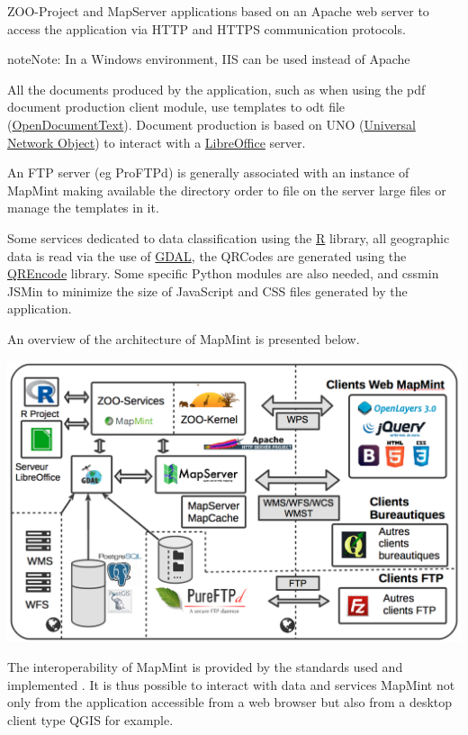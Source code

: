 \documentclass[letterpaper,10pt,english]{sphinxmanual}
\begin{document}
ZOO-Project and MapServer applications based on an Apache web server to access the application via HTTP and HTTPS communication protocols.

\begin{notice}{note}{Note:}
In a Windows environment, IIS can be used instead of Apache
\end{notice}

All the documents produced by the application, such as when using the pdf document production client module, use templates to odt file (\href{https://www.oasis-open.org/committees/tc\_home.php?wg\_abbrev=office}{OpenDocumentText}). Document production is based on UNO (\href{https://www.openoffice.org/udk/common/man/uno.html}{Universal Network Object}) to interact with a \href{http://www.libreoffice.org/}{LibreOffice} server.

An FTP server (eg ProFTPd) is generally associated with an instance of MapMint making available the directory  order to file on the server large files or manage the templates in it.

Some services dedicated to data classification using the \href{http://r-project.org}{R} library, all geographic data is read via the use of  \href{http://www.gdal.org}{GDAL}, the QRCodes are generated using the \href{https://fukuchi.org/works/qrencode/}{QREncode} library. Some specific Python modules are also needed, and cssmin JSMin to minimize the size of JavaScript and CSS files generated by the application.

An overview of the architecture of MapMint is presented below.

\includegraphics{mapmint-arch.png}

The interoperability of MapMint is provided by the standards used and implemented . It is thus possible to interact with data and services MapMint not only from the application accessible from a web browser but also from a desktop client type QGIS for example.
\end{document}
